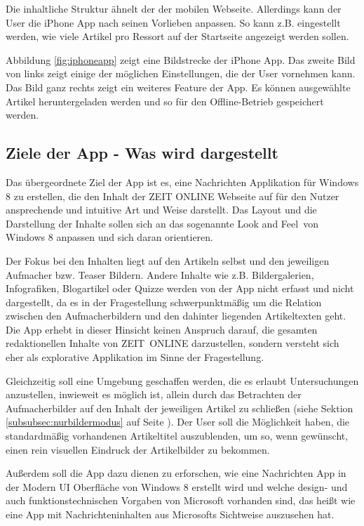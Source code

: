 \documentclass[12pt,a4paper,bibtotoc,abstracton]{scrartcl}
\begin{document}
Die inhaltliche Struktur ähnelt der der mobilen Webseite. Allerdings kann der User die iPhone App nach seinen Vorlieben anpassen. So kann z.B. eingestellt werden, wie viele Artikel pro Ressort auf der Startseite angezeigt werden sollen.

Abbildung \ref{fig:iphoneapp} zeigt eine Bildstrecke der iPhone App. Das zweite Bild von links zeigt einige der möglichen Einstellungen, die der User vornehmen kann. Das Bild ganz rechts zeigt ein weiteres Feature der App. Es können ausgewählte Artikel heruntergeladen werden und so für den Offline-Betrieb gespeichert werden.

\subsection{Ziele der App - Was wird dargestellt}
\label{subsec:zielderapp}
Das übergeordnete Ziel der App ist es, eine Nachrichten Applikation für Windows 8 zu erstellen, die den Inhalt der ZEIT ONLINE Webseite auf für den Nutzer ansprechende und intuitive Art und Weise darstellt. Das Layout und die Darstellung der Inhalte sollen sich an das sogenannte \glqq Look and Feel\grqq\ von Windows 8 anpassen und sich daran orientieren.

Der Fokus bei den Inhalten liegt auf den Artikeln selbst und den jeweiligen Aufmacher bzw. Teaser Bildern. Andere Inhalte wie z.B. Bildergalerien, Infografiken, Blogartikel oder Quizze werden von der App nicht erfasst und nicht dargestellt, da es in der Fragestellung schwerpunktmäßig um die Relation zwischen den Aufmacherbildern und den dahinter liegenden Artikeltexten geht. Die App erhebt in dieser Hinsicht keinen Anspruch darauf, die gesamten redaktionellen Inhalte von \mbox{ZEIT ONLINE} darzustellen, sondern versteht sich eher als explorative Applikation im Sinne der Fragestellung.

Gleichzeitig soll eine Umgebung geschaffen werden, die es erlaubt Untersuchungen anzustellen, inwieweit es möglich ist, allein durch das Betrachten der Aufmacherbilder auf den Inhalt der jeweiligen Artikel zu schließen (siehe Sektion \ref{subsubsec:nurbildermodus} auf Seite \pageref{subsubsec:nurbildermodus}). Der User soll die Möglichkeit haben, die standardmäßig vorhandenen Artikeltitel auszublenden, um so, wenn gewünscht, einen rein visuellen Eindruck der Artikelbilder zu bekommen.

Außerdem soll die App dazu dienen zu erforschen, wie eine Nachrichten App in der Modern UI Oberfläche von Windows 8 erstellt wird und welche design- und auch funktionstechnischen Vorgaben von Microsoft vorhanden sind, das heißt wie eine App mit Nachrichteninhalten aus Microsofts Sichtweise auszusehen hat.
\end{document}
